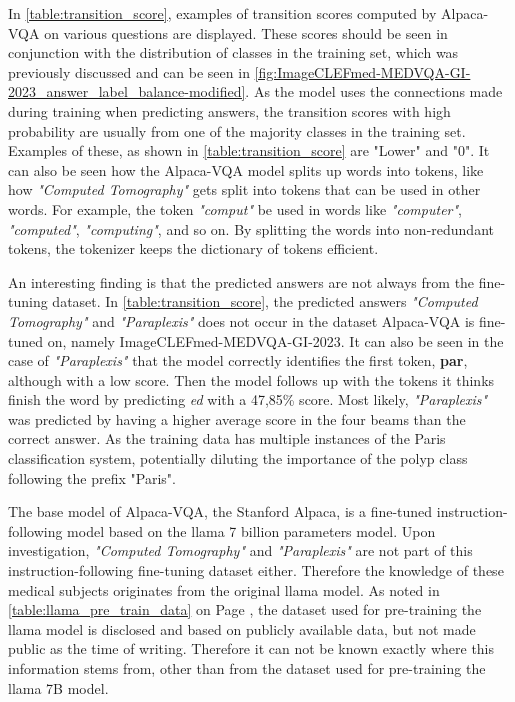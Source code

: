     In \autoref{table:transition_score}, examples of transition scores computed by Alpaca-VQA on various questions are displayed.
    These scores should be seen in conjunction with the distribution of classes in the training set, which was previously discussed and can be seen in \autoref{fig:ImageCLEFmed-MEDVQA-GI-2023_answer_label_balance-modified}. 
    As the model uses the connections made during training when predicting answers, the transition scores with high probability are usually from one of the majority classes in the training set. Examples of these, as shown in \autoref{table:transition_score} are "Lower" and "0". 
    It can also be seen how the Alpaca-VQA model splits up words into tokens, like how \textit{"Computed Tomography"} gets split into tokens that can be used in other words. For example, the token \textit{"comput"} be used in words like \textit{"computer"}, \textit{"computed"}, \textit{"computing"}, and so on. By splitting the words into non-redundant tokens, the tokenizer keeps the dictionary of tokens efficient. 

    An interesting finding is that the predicted answers are not always from the fine-tuning dataset. In \autoref{table:transition_score}, the predicted answers \textit{"Computed Tomography"} and \textit{"Paraplexis"} does not occur in the dataset Alpaca-VQA is fine-tuned on, namely ImageCLEFmed-MEDVQA-GI-2023. 
    It can also be seen in the case of \textit{"Paraplexis"} that the model correctly identifies the first token, \textbf{par}, although with a low score. Then the model follows up with the tokens it thinks finish the word by predicting \textit{ed} with a 47,85\% score. Most likely, \textit{"Paraplexis"} was predicted by having a higher average score in the four beams than the correct answer. As the training data has multiple instances of the Paris classification system, potentially diluting the importance of the polyp class following the prefix "Paris".
    
    The base model of Alpaca-VQA, the Stanford Alpaca, is a fine-tuned instruction-following model based on the \gls{llama} 7 billion parameters model. Upon investigation, \textit{"Computed Tomography"} and \textit{"Paraplexis"} are not part of this instruction-following fine-tuning dataset either. Therefore the knowledge of these medical subjects originates from the original \gls{llama} model. As noted in \autoref{table:llama_pre_train_data} on Page \pageref{table:llama_pre_train_data}, the dataset used for pre-training the \gls{llama} model is disclosed and based on publicly available data, but not made public as the time of writing. Therefore it can not be known exactly where this information stems from, other than from the dataset used for pre-training the \gls{llama} 7B model.


